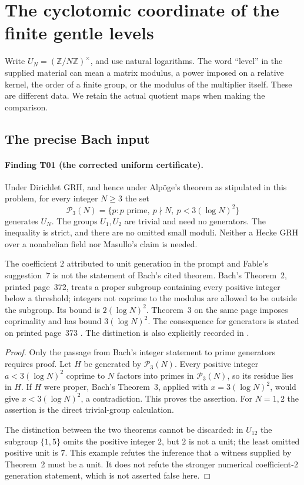 \section{The cyclotomic coordinate of the finite gentle levels}
\label{sec:gt-certificates}

Write $U_N=(\mathbb Z/N\mathbb Z)^\times$, and use natural logarithms.
The word ``level'' in the supplied material can mean a matrix modulus,
a power imposed on a relative kernel, the order of a finite group, or
the modulus of the multiplier itself. These are different data. We
retain the actual quotient maps when making the comparison.

\subsection{The precise Bach input}

\paragraph{Finding T01 (the corrected uniform certificate).}
Under Dirichlet GRH, and hence under Alp\"oge's theorem as stipulated
in this problem, for every integer $N\geq3$ the set
\[
 \mathcal P_3(N)=\{p:p\text{ prime},\ p\nmid N,
                              \ p<3(\log N)^2\}
 \tag{T01}
\]
generates $U_N$. The groups $U_1,U_2$ are trivial and need no generators.
The inequality is strict, and there are no omitted small moduli.
Neither a Hecke GRH over a nonabelian field nor Masullo's claim is needed.

The coefficient $2$ attributed to unit generation in the prompt and
Fable's suggestion~7 is not the statement of Bach's cited theorem.
Bach's Theorem~2, printed page~372, treats a proper subgroup containing
every positive integer below a threshold; integers not coprime to the
modulus are allowed to be outside the subgroup. Its bound is
$2(\log N)^2$. Theorem~3 on the same page imposes coprimality and has
bound $3(\log N)^2$. The consequence for generators is stated on
printed page~373 \cite[Theorems~2--3, pp.~372--373]{Bach1990}.
The distinction is also explicitly recorded in
\cite[\S1.1]{LLS2015}.

\begin{proof}
Only the passage from Bach's integer statement to prime generators
requires proof. Let $H$ be generated by $\mathcal P_3(N)$. Every positive
integer $a<3(\log N)^2$ coprime to $N$ factors into primes in
$\mathcal P_3(N)$, so its residue lies in $H$. If $H$ were proper,
Bach's Theorem~3, applied with $x=3(\log N)^2$, would give
$x<3(\log N)^2$, a contradiction. This proves the assertion. For
$N=1,2$ the assertion is the direct trivial-group calculation.

The distinction between the two theorems cannot be discarded: in
$U_{12}$ the subgroup $\{1,5\}$ omits the positive integer $2$, but
$2$ is not a unit; the least omitted positive unit is $7$. This example
refutes the inference that a witness supplied by Theorem~2 must be a
unit. It does not refute the stronger numerical coefficient-$2$
generation statement, which is not asserted false here.
\end{proof}

